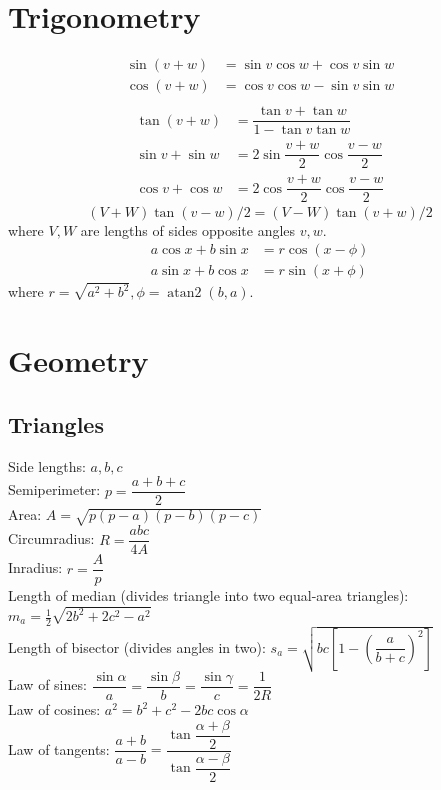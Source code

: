 \section{Trigonometry}
\begin{align*}
\sin(v+w)&{}=\sin v\cos w+\cos v\sin w\\
\cos(v+w)&{}=\cos v\cos w-\sin v\sin w\\
\end{align*}
\begin{align*}
\tan(v+w)&{}=\dfrac{\tan v+\tan w}{1-\tan v\tan w}\\
\sin v+\sin w&{}=2\sin\dfrac{v+w}{2}\cos\dfrac{v-w}{2}\\
\cos v+\cos w&{}=2\cos\dfrac{v+w}{2}\cos\dfrac{v-w}{2}
\end{align*}
\[ (V+W)\tan(v-w)/2{}=(V-W)\tan(v+w)/2 \]
where $V, W$ are lengths of sides opposite angles $v, w$.
\begin{align*}
	a\cos x+b\sin x&=r\cos(x-\phi)\\
	a\sin x+b\cos x&=r\sin(x+\phi)
\end{align*}
where $r=\sqrt{a^2+b^2}, \phi=\operatorname{atan2}(b,a)$.

\section{Geometry}

\subsection{Triangles}
Side lengths: $a,b,c$\\
Semiperimeter: $p=\dfrac{a+b+c}{2}$\\
Area: $A=\sqrt{p(p-a)(p-b)(p-c)}$\\
Circumradius: $R=\dfrac{abc}{4A}$\\
Inradius: $r=\dfrac{A}{p}$\\
Length of median (divides triangle into two equal-area triangles): $m_a=\tfrac{1}{2}\sqrt{2b^2+2c^2-a^2}$\\
Length of bisector (divides angles in two): $s_a=\sqrt{bc\left[1-\left(\dfrac{a}{b+c}\right)^2\right]}$\\
Law of sines: $\dfrac{\sin\alpha}{a}=\dfrac{\sin\beta}{b}=\dfrac{\sin\gamma}{c}=\dfrac{1}{2R}$\\
Law of cosines: $a^2=b^2+c^2-2bc\cos\alpha$\\
Law of tangents: $\dfrac{a+b}{a-b}=\dfrac{\tan\dfrac{\alpha+\beta}{2}}{\tan\dfrac{\alpha-\beta}{2}}$ \bigskip

